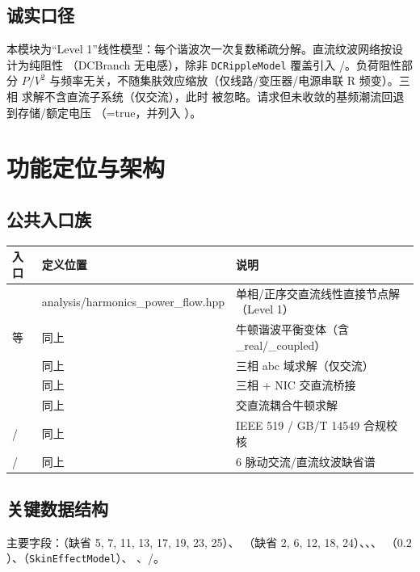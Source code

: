 \documentclass[UTF8,fontset=fandol,a4paper,11pt]{ctexart}
\begin{document}
\subsection{诚实口径}
本模块为“Level 1”线性模型：每个谐波次一次复数稀疏分解。直流纹波网络按设计为纯阻性
（DCBranch 无电感），除非 \texttt{DCRippleModel} 覆盖引入 /。负荷阻性部分
$P/V^2$ 与频率无关，不随集肤效应缩放（仅线路/变压器/电源串联 R 频变）。三相
 求解不含直流子系统（仅交流），此时
 被忽略。请求但未收敛的基频潮流回退到存储/额定电压
（=true，并列入 ）。

\section{功能定位与架构}
\subsection{公共入口族}
\begin{center}\footnotesize
\begin{tabular}{@{}L{6.6cm}L{3.0cm}L{5.4cm}@{}}
\toprule
入口 & 定义位置 & 说明\\
\midrule
{} & analysis/harmonics\_power\_flow.hpp & 单相/正序交直流线性直接节点解（Level 1）\\
 等 & 同上 & 牛顿谐波平衡变体（含 \_real/\_coupled）\\
 & 同上 & 三相 abc 域求解（仅交流）\\
 & 同上 & 三相 + NIC 交直流桥接\\
 & 同上 & 交直流耦合牛顿求解\\
 /  & 同上 & IEEE 519 / GB/T 14549 合规校核\\
 /  & 同上 & 6 脉动交流/直流纹波缺省谱\\
\bottomrule
\end{tabular}
\end{center}

\subsection{关键数据结构}
主要字段：（缺省 5, 7, 11, 13, 17, 19, 23, 25）、
（缺省 2, 6, 12, 18, 24）、、、
（$0.2$）、（\texttt{SkinEffectModel}）、
、/。
\end{document}
